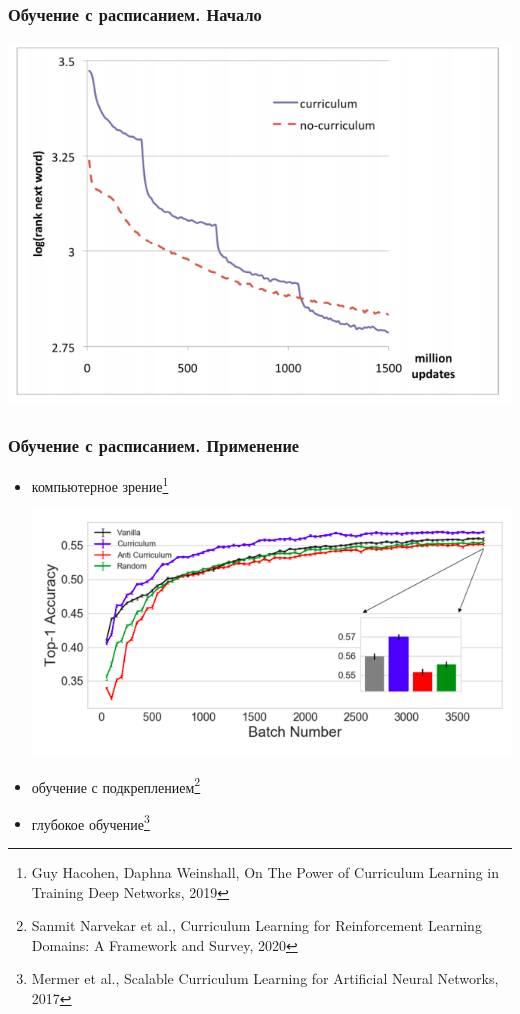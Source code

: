 \documentclass{beamer}
\begin{document}
\begin{frame}
	\frametitle{Обучение с расписанием. Начало}
	
	\begin{center}
		\includegraphics[scale=0.4]{bengio_exp1}
	\end{center}
	
	\let\thefootnote\relax{}
\end{frame}

\begin{frame}
	\frametitle{Обучение с расписанием. Применение}
	\begin{itemize}
		\item компьютерное зрение\footnote[1]{Guy Hacohen, Daphna Weinshall, On The Power of Curriculum Learning in Training Deep Networks, 2019}

		\includegraphics[scale=0.3]{curriculum_learning_cv}
		
		\item обучение с подкреплением\footnote[2]{Sanmit Narvekar et al., Curriculum Learning for Reinforcement Learning Domains: A Framework and Survey, 2020}
		
		\item глубокое обучение\footnote[3]{Mermer et al., Scalable Curriculum Learning for Artificial Neural Networks, 2017}
	\end{itemize}
\end{frame}
\end{document}
